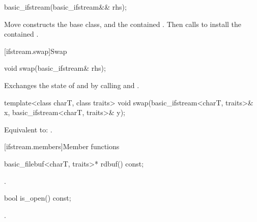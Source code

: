 %
\begin{itemdecl}
basic_ifstream(basic_ifstream&& rhs);
\end{itemdecl}

\begin{itemdescr}
\pnum
\effects
Move constructs the base class, and the contained .
Then calls 
to install the contained .
\end{itemdescr}

[ifstream.swap]{Swap}

%
\begin{itemdecl}
void swap(basic_ifstream& rhs);
\end{itemdecl}

\begin{itemdescr}
\pnum
\effects
Exchanges the state of 
and  by calling
 and
.
\end{itemdescr}

%
\begin{itemdecl}
template<class charT, class traits>
  void swap(basic_ifstream<charT, traits>& x, basic_ifstream<charT, traits>& y);
\end{itemdecl}

\begin{itemdescr}
\pnum
\effects
Equivalent to: .
\end{itemdescr}

[ifstream.members]{Member functions}

%
\begin{itemdecl}
basic_filebuf<charT, traits>* rdbuf() const;
\end{itemdecl}

\begin{itemdescr}
\pnum
\returns
{}.
\end{itemdescr}

%
\begin{itemdecl}
bool is_open() const;
\end{itemdecl}

\begin{itemdescr}
\pnum
\returns
{}.
\end{itemdescr}

